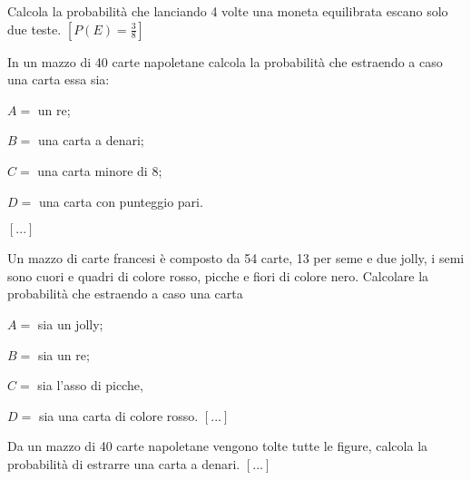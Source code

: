 \begin{esercizio}[\Ast]
 \label{ese:9.16}
Calcola la probabilità che lanciando 4 volte una moneta equilibrata escano solo 
due teste.
\hfill $\left[P(E)=\frac 3 8\right]$
\end{esercizio}

\begin{esercizio}
 \label{ese:9.20}
 In un mazzo di 40 carte napoletane calcola la probabilità che estraendo a caso 
una carta essa sia:
\begin{itemize*}
\item $ A= $ un re;
\item $ B= $ una carta a denari;
\item $ C= $ una carta minore di 8;
\item $ D = $ una carta con punteggio pari.
\end{itemize*}
\hfill $\left[...\right]$
\end{esercizio}

\begin{esercizio}
 \label{ese:9.21}
Un mazzo di carte francesi è composto da 54 carte, 13 per seme e due jolly, i 
semi sono cuori e quadri di colore rosso, picche e fiori di colore nero. 
Calcolare la probabilità che estraendo a caso una carta
\begin{itemize*}
\item $ A= $ sia un jolly;
\item $ B= $ sia un re;
\item $ C= $ sia l'asso di picche,
\item $ D= $ sia una carta di colore rosso.
\hfill $\left[...\right]$
\end{itemize*}
\end{esercizio}

\begin{esercizio}
 \label{ese:9.22}
Da un mazzo di 40 carte napoletane vengono tolte tutte le figure, calcola la 
probabilità di estrarre una carta a denari.
\hfill $\left[...\right]$
\end{esercizio}


